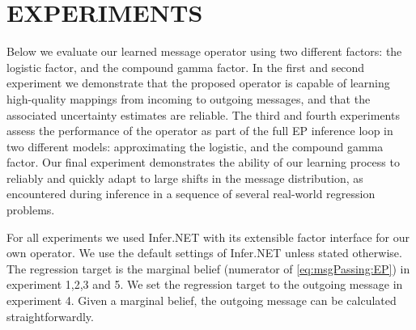 \documentclass[english]{article}
\theoremstyle{plain}
\theoremstyle{plain}
\newcommand{\factor}{f}				%
\newcommand{\msg}[2]{m_{#1 \rightarrow #2}}			%
\begin{document}
\section{EXPERIMENTS  }
\label{sec:Experiments}

Below we evaluate our learned message operator using two different factors: the logistic factor, and the compound gamma factor. In the first and second experiment we demonstrate that the proposed operator is capable of learning high-quality mappings from incoming to outgoing messages, and that the associated uncertainty estimates are  reliable. The third and fourth experiments assess the performance of the operator as part of the full EP inference loop in two different models: approximating the logistic, and the compound gamma factor. Our final experiment demonstrates the  ability of our learning process to reliably and quickly adapt to large shifts in the message distribution, as encountered during inference in a sequence of several real-world regression problems. 


For all experiments we used Infer.NET \citep{Minka2014} with its extensible factor interface for our own operator. 
We use the default settings of Infer.NET unless stated otherwise. 
The regression target is the marginal belief (numerator of \eqref{eq:msgPassing:EP}) in experiment 1,2,3 and 5. We set the regression target to the outgoing message in experiment 4. 
Given a marginal belief, the outgoing message can be calculated straightforwardly.


\end{document}
